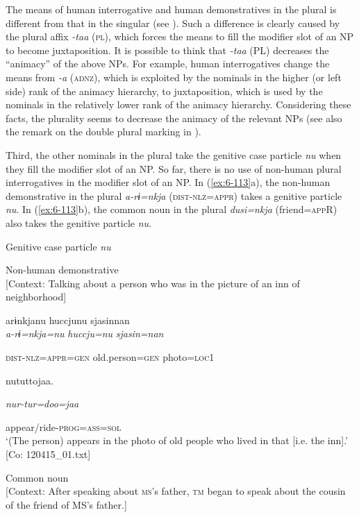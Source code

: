 \begin{table}
The means of human interrogative and human demonstratives in the plural is different from that in the singular (see ). Such a difference is clearly caused by the plural affix \textit{-taa} (\textsc{pl}), which forces the means to fill the modifier slot of an NP to become juxtaposition. It is possible to think that \textit{-taa} (PL) decreases the “animacy” of the above NPs. For example, human interrogatives change the means from \textit{-a} (\textsc{adnz}), which is exploited by the nominals in the higher (or left side) rank of the animacy hierarchy, to juxtaposition, which is used by the nominals in the relatively lower rank of the animacy hierarchy. Considering these facts, the plurality seems to decrease the animacy of the relevant NPs (see also the remark on the double plural marking in ).

  Third, the other nominals in the plural take the genitive case particle \textit{nu} when they fill the modifier slot of an NP. So far, there is no use of non-human plural interrogatives in the modifier slot of an NP. In (\ref{ex:6-113}a), the non-human demonstrative in the plural \textit{a-rɨ=nkja} (\textsc{dist}-\textsc{nlz}=\textsc{appr}) takes a genitive particle \textit{nu}. In (\ref{ex:6-113}b), the common noun in the plural \textit{dusi=nkja} (friend=\textsc{app}R) also takes the genitive particle \textit{nu}.

\ea\label{ex:6-113}
  Genitive case particle \textit{nu}

 \ea Non-human demonstrative\\{}
[Context: Talking about a person who was in the picture of an inn of neighborhood]

{\TM}
\glll arɨnkjanu  huccjunu  sjasinnan\\

      \textit{a-rɨ=nkja=nu}  \textit{huccju=nu}  \textit{sjasin=nan}

      \textsc{dist}-\textsc{nlz}=\textsc{appr}=\textsc{gen}  old.person=\textsc{gen}  photo=\textsc{loc}1

      nututtojaa.

      \textit{nur-tur=doo=jaa}

      appear/ride-\textsc{prog}=\textsc{ass}=\textsc{sol}\\
\glt ‘(The person) appears in the photo of old people who lived in that [i.e. the inn].’ [Co: 120415\_01.txt]
\z

\ex Common noun\\{}
[Context: After speaking about \textsc{ms}’s father, \textsc{tm} began to speak about the cousin of the friend of MS’s father.]


\end{table}
